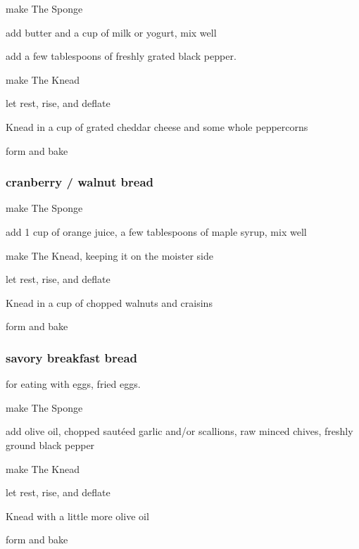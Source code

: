 \begin{algorithm}
  \item make The Sponge
  \item add butter and a cup of milk or yogurt, mix well
  \item add a few tablespoons of freshly grated black pepper.
  \item make The Knead
  \item let rest, rise, and deflate
  \item Knead in a cup of grated cheddar cheese and some whole peppercorns
  \item form and bake
\end{algorithm}

\subsubsection{cranberry / walnut bread}

\begin{algorithm}
  \item make The Sponge
  \item add 1 cup of orange juice, a few tablespoons of maple syrup, mix well
  \item make The Knead, keeping it on the moister side
  \item let rest, rise, and deflate
  \item Knead in a cup of chopped walnuts and craisins
  \item form and bake
\end{algorithm}

\subsubsection{savory breakfast bread}

for eating with eggs, fried eggs.

\begin{algorithm}
  \item make The Sponge
  \item add olive oil, chopped saut\'{e}ed garlic and/or scallions, raw minced chives, freshly ground black pepper 
  \item make The Knead
  \item let rest, rise, and deflate
  \item Knead with a little more olive oil
  \item form and bake
\end{algorithm}

